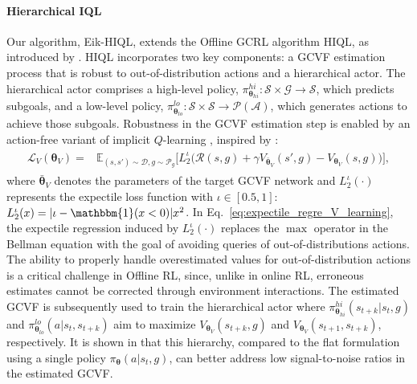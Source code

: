 \documentclass{article}
\theoremstyle{plain}
\theoremstyle{definition}
\theoremstyle{remark}
\begin{document}
\paragraph{Hierarchical IQL} Our algorithm, Eik-HIQL, extends the Offline GCRL algorithm HIQL, as introduced by \citet{park2024hiql}. HIQL incorporates two key components: a GCVF estimation process that is robust to out-of-distribution actions and a hierarchical actor. The hierarchical actor comprises a high-level policy, $\pi^{hi}_{\bm{\theta}_{hi}}: \mathcal{S} \times \mathcal{G} \to \mathcal{S}$, which predicts subgoals, and a low-level policy, $\pi^{lo}_{\bm{\theta}_{lo}}:\mathcal{S} \times \mathcal{S} \to \mathcal{P}(\mathcal{A})$, which generates actions to achieve those subgoals. Robustness in the GCVF estimation step is enabled by an action-free variant of implicit $Q$-learning \cite{kostrikov2021offline}, inspired by \cite{xu2022policy, ghosh2023reinforcement}:
\begin{align}
    \begin{split}
        \mathcal{L}_V(\bm{\theta}_V) =& \mathbb{E}_{(s,s') \sim \mathcal{D}, g \sim \mathcal{P}_g}\Big[L_2^{\iota}\big(\mathcal{R}(s,g) + \gamma V_{\bar{\bm{\theta}}_V} (s', g) - V_{\bm{\theta}_V} (s, g)\big)\Big],
    \end{split}
    \label{eq:expectile_regre_V_learning}
\end{align}
where $\bar{\bm{\theta}}_V$ denotes the parameters of the target GCVF network \cite{mnih2013playing} and $L_2^{\iota}(\cdot)$ represents the expectile loss function with $\iota \in [0.5, 1]$: $L_2^{\iota}(x) = |\iota - \mathbbm{1}(x < 0)|x^2$. In Eq.~\eqref{eq:expectile_regre_V_learning}, the expectile regression induced by $L_2^{\iota}(\cdot)$ replaces the $\max$ operator in the Bellman equation \cite{sutton2018reinforcement} with the goal of avoiding queries of out-of-distributions actions.
The ability to properly handle overestimated values for out-of-distribution actions is a critical challenge in Offline RL, since, unlike in online RL, erroneous estimates cannot be corrected through environment interactions. The estimated GCVF is subsequently used to train the hierarchical actor where $\pi^{hi}_{\bm{\theta}_{hi}}(s_{t+k}| s_t, g)$ and $\pi^{lo}_{\bm{\theta}_{lo}}(a| s_t, s_{t+k})$ aim to maximize $V_{\bm{\theta}_V}(s_{t+k}, g)$ and $V_{\bm{\theta}_V}(s_{t+1}, s_{t+k})$, respectively. It is shown in \citet{park2024hiql} that this hierarchy, compared to the flat formulation using a single policy $\pi_{\bm{\theta}}(a| s_t, g)$, can better address low signal-to-noise ratios in the estimated GCVF.
\end{document}
